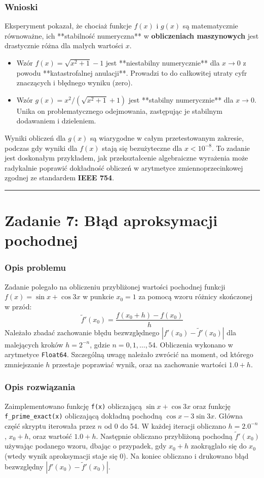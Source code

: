 \documentclass[11pt, a4paper]{article}
\newcommand{\taskseparator}{\leavevmode\leaders\hrule height 0.5pt\hfill\kern0pt}
\begin{document}
\subsubsection{Wnioski}
Eksperyment pokazał, że chociaż funkcje $f(x)$ i $g(x)$ są matematycznie równoważne, ich **stabilność numeryczna** w \textbf{obliczeniach maszynowych} jest drastycznie różna dla małych wartości $x$.
\begin{itemize}
    \item Wzór $f(x) = \sqrt{x^2+1} - 1$ jest **niestabilny numerycznie** dla $x \to 0$ z powodu **katastrofalnej anulacji**. Prowadzi to do całkowitej utraty cyfr znaczących i błędnego wyniku (zero).
    \item Wzór $g(x) = x^2 / (\sqrt{x^2+1} + 1)$ jest **stabilny numerycznie** dla $x \to 0$. Unika on problematycznego odejmowania, zastępując je stabilnym dodawaniem i dzieleniem.
\end{itemize}
Wyniki obliczeń dla $g(x)$ są wiarygodne w całym przetestowanym zakresie, podczas gdy wyniki dla $f(x)$ stają się bezużyteczne dla $x < 10^{-8}$. To zadanie jest doskonałym przykładem, jak przekształcenie algebraiczne wyrażenia może radykalnie poprawić dokładność obliczeń w arytmetyce zmiennoprzecinkowej zgodnej ze standardem \textbf{IEEE 754}.

\taskseparator

\section{Zadanie 7: Błąd aproksymacji pochodnej}

\subsubsection{Opis problemu}
Zadanie polegało na obliczeniu przybliżonej wartości pochodnej funkcji $f(x) = \sin x + \cos 3x$ w punkcie $x_0 = 1$ za pomocą wzoru różnicy skończonej w przód:
\[
    \tilde{f}'(x_0) = \frac{f(x_0 + h) - f(x_0)}{h}
\]
Należało zbadać zachowanie błędu bezwzględnego $|f'(x_0) - \tilde{f}'(x_0)|$ dla malejących kroków $h = 2^{-n}$, gdzie $n = 0, 1, \dots, 54$. Obliczenia wykonano w arytmetyce \texttt{Float64}. Szczególną uwagę należało zwrócić na moment, od którego zmniejszanie $h$ przestaje poprawiać wynik, oraz na zachowanie wartości $1.0 + h$.

\subsubsection{Opis rozwiązania}
Zaimplementowano funkcję \texttt{f(x)} obliczającą $\sin x + \cos 3x$ oraz funkcję \texttt{f\_prime\_exact(x)} obliczającą dokładną pochodną $\cos x - 3\sin 3x$. Główna część skryptu iterowała przez $n$ od 0 do 54. W każdej iteracji obliczano $h = 2.0^{-n}$, $x_0 + h$, oraz wartość $1.0 + h$. Następnie obliczano przybliżoną pochodną $\tilde{f}'(x_0)$ używając podanego wzoru, dbając o przypadek, gdy $x_0+h$ zaokrąglało się do $x_0$ (wtedy wynik aproksymacji staje się 0). Na koniec obliczano i drukowano błąd bezwzględny $|f'(x_0) - \tilde{f}'(x_0)|$.
\end{document}
